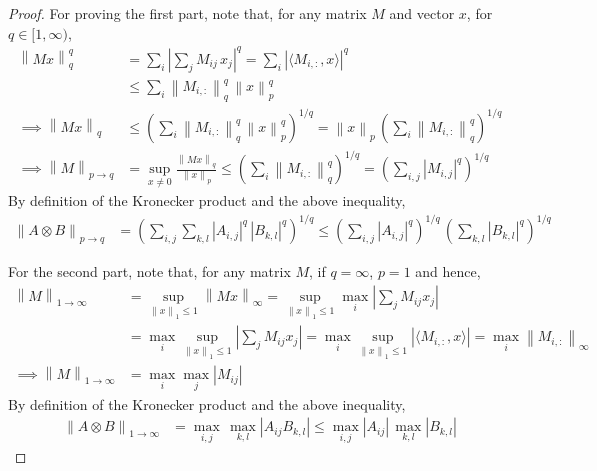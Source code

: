 \documentclass{article}
\newcommand{\norm}[1]{\left\|#1 \right\|}
\begin{document}
\begin{proof}
For proving the first part, note that, for any matrix $M$ and vector $x$, for $q \in [1, \infty)$, 
\begin{align}
\norm{Mx}_q^q &= \sum_{i}\left|\sum_{j}M_{ij} \, x_j\right|^q =  \sum_{i} \left|\langle M_{i,:} , x \rangle \right|^q \tag{By definition of $\norm{\cdot}_q$}\\
&\leq \sum_{i} \norm{M_{i,:}}^{q}_{q} \, \norm{x}^{q}_p \tag{Using Holder's inequality} \\
\implies \norm{Mx}_q & \leq \left(\sum_{i} \norm{M_{i,:}}^{q}_{q} \, \norm{x}^{q}_p \right)^{1/q} = \norm{x}_p \, \left(\sum_{i} \norm{M_{i,:}}^{q}_{q} \right)^{1/q} \\
\implies \norm{M}_{p \to q} &= \sup_{x\neq 0}\frac{\norm{Mx}_q}{\norm{x}_p} \leq \left(\sum_{i} \norm{M_{i,:}}^{q}_{q} \right)^{1/q} = \left(\sum_{i,j} |M_{i,j}|^{q} \right)^{1/q} \label{eq:kron-inter-1}
\end{align}
By definition of the Kronecker product and the above inequality, 
\begin{align*}
\norm{A\otimes B}_{p \to q} & = \left(\sum_{i,j} \sum_{k,l} |A_{i,j}|^{q} \, |B_{k,l}|^{q} \right)^{1/q} \leq  \left(\sum_{i,j} |A_{i,j}|^{q} \right)^{1/q}  \, \left(\sum_{k,l} |B_{k,l}|^{q} \right)^{1/q} 
\end{align*}

For the second part, note that, for any matrix $M$, if $q  = \infty$, $p = 1$ and hence, 
\begin{align}
\norm{M}_{1\to\infty} &= \sup_{\norm{x}_1\leq 1}\norm{Mx}_\infty = \sup_{\norm{x}_1\leq 1}\max_i\left|\sum_j M_{ij}x_j\right| \tag{By definition of $\norm{\cdot}_\infty$}\\
&= \max_i\sup_{\norm{x}_1\leq 1}\left|\sum_j M_{ij}x_j\right| = \max_i\sup_{\norm{x}_1\leq 1}|\langle M_{i,:},x\rangle| = \max_i \norm{M_{i,:}}_\infty \tag{By definition of dual norm}\\
\implies \norm{M}_{1\to\infty} &= \max_i\max_j |M_{ij}| \label{eq:kron-inter-2}
\end{align}
By definition of the Kronecker product and the above inequality, 
\begin{align*}
\norm{A\otimes B}_{1 \to \infty} & = \max_{i,j} \, \max_{k,l} |A_{ij} B_{k,l}| \leq \max_{i,j }|A_{ij}| \, \max_{k,l} |B_{k,l}|  
\end{align*}
\end{proof}
\end{document}
